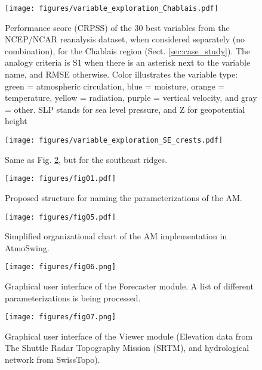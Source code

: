 \documentclass[review]{elsarticle}
\begin{document}


\clearpage


\begin{figure}[t]
	\texttt{[image: figures/variable\_exploration\_Chablais.pdf]}
	\caption{Performance score (CRPSS) of the 30 best variables from the NCEP/NCAR reanalysis dataset, when considered separately (no combination), for the Chablais region (Sect. \ref{sec:case_study}). The analogy criteria is S1 when there is an asterisk next to the variable name, and RMSE otherwise. Color illustrates the variable type: green = atmospheric circulation, blue = moisture, orange = temperature, yellow = radiation, purple = vertical velocity, and gray = other. SLP stands for sea level pressure, and Z for geopotential height}
	\label{figure:variable_exploration_Chablais}
\end{figure}

\begin{figure}[t]
	\texttt{[image: figures/variable\_exploration\_SE\_crests.pdf]}
	\caption{Same as Fig. \ref{figure:variable_exploration_SE_crests}, but for the southeast ridges.}
	\label{figure:variable_exploration_SE_crests}
\end{figure}

\begin{figure}[t]
	\texttt{[image: figures/fig01.pdf]}
	\caption{Proposed structure for naming the parameterizations of the AM.}
	\label{figure:nomenclature}
\end{figure}

\begin{figure}[t]
	\texttt{[image: figures/fig05.pdf]}
	\caption{Simplified organizational chart of the AM implementation in AtmoSwing.}
	\label{figure:flowchart_modules_atmoswing}
\end{figure}

\begin{figure}[t]
	\texttt{[image: figures/fig06.png]}
	\caption{Graphical user interface of the Forecaster module. A list of different parameterizations is being processed.}
	\label{figure:atmoswing-forecaster-gui}
\end{figure}

\begin{figure*}[t]
	\texttt{[image: figures/fig07.png]}
	\caption{Graphical user interface of the Viewer module (Elevation data from The Shuttle Radar Topography Mission (SRTM), and hydrological network from SwissTopo).}
	\label{figure:atmoswing-viewer-gui}
\end{figure*}
\end{document}
